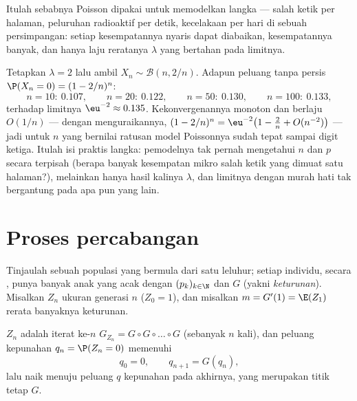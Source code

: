 \begin{remark}
Itulah sebabnya  Poisson dipakai untuk memodelkan  langka --- salah ketik per
halaman, peluruhan radioaktif per detik, kecelakaan per hari di sebuah
persimpangan: setiap kesempatannya nyaris dapat diabaikan, kesempatannya
banyak, dan hanya laju reratanya $\lambda$ yang bertahan pada limitnya.
\end{remark}

\begin{example}\label{ex:b2:genfun:poissonnumerics}
Tetapkan $\lambda = 2$ lalu ambil $X_n \sim \mathcal B(n, 2/n)$. Adapun
peluang tanpa  persis $\P(X_n = 0) = (1 - 2/n)^n$:
\[
n = 10:\ 0.107, \qquad
n = 20:\ 0.122, \qquad
n = 50:\ 0.130, \qquad
n = 100:\ 0.133,
\]
terhadap limitnya $\eu^{-2} \approx 0.135$. Kekonvergenannya
monoton dan berlaju $O(1/n)$ --- dengan menguraikannya, $(1 -
2/n)^n = \eu^{-2}\bigl(1 - \tfrac2n + O(n^{-2})\bigr)$ ---
jadi untuk $n$ yang bernilai ratusan model Poissonnya sudah
tepat sampai digit ketiga. Itulah isi praktis
  langka: pemodelnya tak pernah mengetahui $n$ dan
$p$ secara terpisah (berapa banyak kesempatan mikro salah ketik yang
dimuat satu halaman?), melainkan hanya hasil kalinya $\lambda$, dan
 limitnya dengan murah hati tak bergantung pada apa pun yang lain.
\end{example}

\section{Proses percabangan}

Tinjaulah sebuah populasi yang bermula dari satu leluhur; setiap individu,
secara , punya banyak anak yang acak dengan  $(p_k)_{k
\in \N}$ dan  $G$ (yakni \emph{
keturunan}). Misalkan $Z_n$ ukuran generasi $n$ ($Z_0 =
1$), dan misalkan $m = G'(1) = \E(Z_1)$ rerata banyaknya keturunan.

\begin{proposition}\label{prop:b2:genfun:branching}
 $Z_n$ adalah iterat ke-$n$
$G_{Z_n} = G \circ G \circ \dots \circ G$ (sebanyak $n$ kali), dan
peluang kepunahan $q_n = \P(Z_n = 0)$ memenuhi
\[
q_0 = 0, \qquad q_{n+1} = G(q_n),
\]
lalu naik menuju peluang $q$ kepunahan pada akhirnya, yang
merupakan titik tetap $G$.
\end{proposition}

